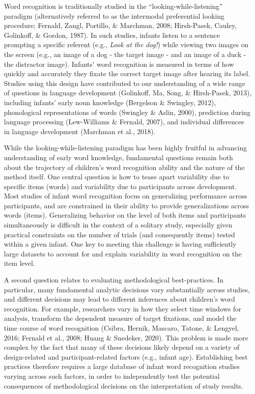 \documentclass[10pt, letterpaper]{article}
\begin{document}
Word recognition is traditionally studied in the
``looking-while-listening'' paradigm (alternatively referred to as the
intermodal preferential looking procedure; Fernald, Zangl, Portillo, \&
Marchman, 2008; Hirsh-Pasek, Cauley, Golinkoff, \& Gordon, 1987). In
such studies, infants listen to a sentence prompting a specific referent
(e.g., \emph{Look at the dog!}) while viewing two images on the screen
(e.g., an image of a dog - the target image - and an image of a duck -
the distractor image). Infants' word recognition is measured in terms of
how quickly and accurately they fixate the correct target image after
hearing its label. Studies using this design have contributed to our
understanding of a wide range of questions in language development
(Golinkoff, Ma, Song, \& Hirsh-Pasek, 2013), including infants' early
noun knowledge (Bergelson \& Swingley, 2012), phonological
representations of words (Swingley \& Aslin, 2000), prediction during
language processing (Lew-Williams \& Fernald, 2007), and individual
differences in language development (Marchman et al., 2018).

While the looking-while-listening paradigm has been highly fruitful in
advancing understanding of early word knowledge, fundamental questions
remain both about the trajectory of children's word recognition ability
and the nature of the method itself. One central question is how to
tease apart variability due to specific items (words) and variability
due to participants across development. Most studies of infant word
recognition focus on generalizing performance across participants, and
are constrained in their ability to provide generalizations across words
(items). Generalizing behavior on the level of both items and
participants simultaneously is difficult in the context of a solitary
study, especially given practical constraints on the number of trials
(and consequently items) tested within a given infant. One key to
meeting this challenge is having sufficiently large datasets to account
for and explain variability in word recognition on the item level.

A second question relates to evaluating methodological best-practices.
In particular, many fundamental analytic decisions vary substantially
across studies, and different decisions may lead to different inferences
about children's word recognition. For example, researchers vary in how
they select time windows for analysis, transform the dependent measure
of target fixations, and model the time course of word recognition
(Csibra, Hernik, Mascaro, Tatone, \& Lengyel, 2016; Fernald et al.,
2008; Huang \& Snedeker, 2020). This problem is made more complex by the
fact that many of these decisions likely depend on a variety of
design-related and participant-related factors (e.g., infant age).
Establishing best practices therefore requires a large database of
infant word recognition studies varying across such factors, in order to
independently test the potential consequences of methodological
decisions on the interpretation of study results.
\end{document}
